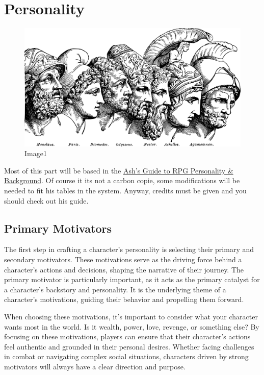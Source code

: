 \hypertarget{personality}{%
\section{Personality}\label{personality}}

\begin{figure}
\centering
\includegraphics{./images/personality01.pdf}
\caption{Image1}
\end{figure}

Most of this part will be based in the
\href{https://www.ashami.com/rpg/}{Ash's Guide to RPG Personality \&
Background}. Of course it its not a carbon copie, some modifications
will be needed to fit his tables in the system. Anyway, credits must be
given and you should check out his guide.

\hypertarget{primary-motivators}{%
\subsection{Primary Motivators}\label{primary-motivators}}

The first step in crafting a character's personality is selecting their
primary and secondary motivators. These motivations serve as the driving
force behind a character's actions and decisions, shaping the narrative
of their journey. The primary motivator is particularly important, as it
acts as the primary catalyst for a character's backstory and
personality. It is the underlying theme of a character's motivations,
guiding their behavior and propelling them forward.

When choosing these motivations, it's important to consider what your
character wants most in the world. Is it wealth, power, love, revenge,
or something else? By focusing on these motivations, players can ensure
that their character's actions feel authentic and grounded in their
personal desires. Whether facing challenges in combat or navigating
complex social situations, characters driven by strong motivators will
always have a clear direction and purpose.

